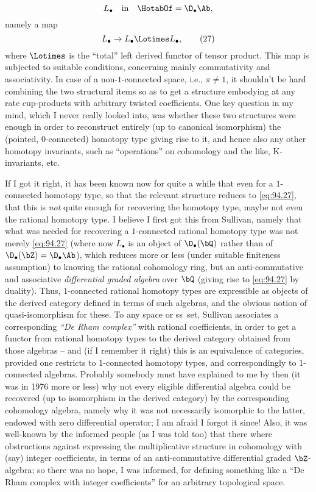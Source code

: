 \[L_\bullet\quad\text{in}\quad \HotabOf=\D_\bullet\Ab,\]
namely a map
\begin{equation}
  \label{eq:94.27}
  L_\bullet \to L_\bullet \Lotimes L_\bullet,\tag{27}
\end{equation}
where $\Lotimes$ is the ``total''
left derived functor of tensor product. This map is subjected to
suitable conditions, concerning mainly commutativity and
associativity. In case of a non-$1$-connected space, i.e., $\pi\ne1$,
it shouldn't be hard combining the two structural items so as to get a
structure embodying at any rate cup-products with arbitrary twisted
coefficients. One key question in my mind, which I never really looked
into, was whether these two structures were enough in order to
reconstruct entirely (up to canonical isomorphism) the (pointed,
$0$-connected) homotopy type giving rise to it, and hence also any
other homotopy invariants, such as ``operations'' on cohomology and
the like, K-invariants, etc.

If I got it right, it has been known now for quite a while that even
for a $1$-connected homotopy type, so that the relevant structure
reduces to \eqref{eq:94.27}, that this is \emph{not} quite enough for
recovering the homotopy type, maybe not even the rational homotopy
type. I believe I first got this from Sullivan, namely
that what was needed for recovering a $1$-connected
rational homotopy type was not merely \eqref{eq:94.27} (where now
$L_\bullet$ is an object of $\D_\bullet(\bQ)$ rather than of
$\D_\bullet(\bZ)=\D_\bullet\Ab$), which reduces more or less (under
suitable finiteness assumption) to knowing the rational cohomology
ring, but an anti-commutative and associative \emph{differential graded
algebra} over $\bQ$ (giving rise to \eqref{eq:94.27} by
duality). Thus, $1$-connected rational homotopy types are expressible
as objects of the derived category defined in terms of such algebras,
and the obvious notion of quasi-isomorphism for these. To any space or
ss~set, Sullivan associates a corresponding \emph{``De Rham complex''}
with rational coefficients, in order to get a functor from rational
homotopy types to the derived category obtained from those algebras --
and (if I remember it right) this is an equivalence of categories,
provided one restricts to $1$-connected homotopy types, and
correspondingly to $1$-connected algebras. Probably somebody must have
explained to me by then (it was in 1976 more or less) why not every
eligible differential algebra could be recovered (up to isomorphism in
the derived category) by the corresponding cohomology algebra, namely
why it was not necessarily isomorphic to the latter, endowed with zero
differential operator; I am afraid I forgot it since! Also, it was
well-known by the informed people (as I was told too) that there where
obstructions against expressing the multiplicative structure in
cohomology with (say) integer coefficients, in terms of an
anti-commutative differential graded $\bZ$-algebra; so there was no
hope, I was informed, for defining something like a ``De Rham complex
with integer coefficients'' for an arbitrary topological space.

